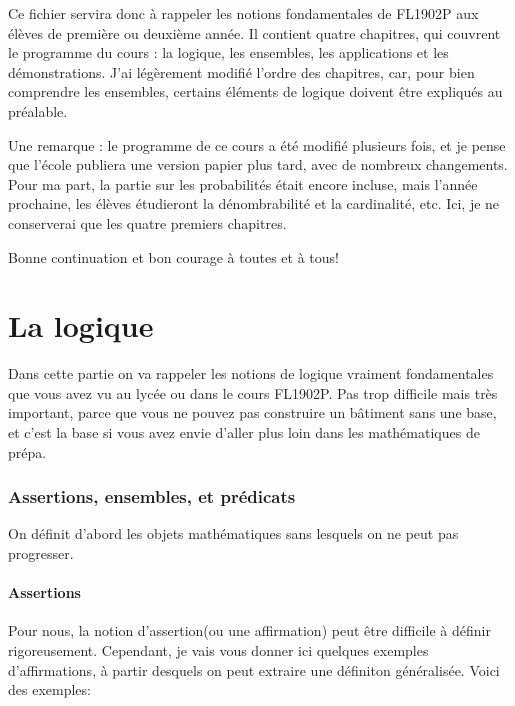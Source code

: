 \documentclass{article}
\begin{document}
Ce fichier servira donc à rappeler les notions fondamentales de FL1902P aux élèves de première ou deuxième année. Il contient quatre chapitres, qui couvrent le programme du cours : la logique, les ensembles, les applications et les démonstrations. J’ai légèrement modifié l’ordre des chapitres, car, pour bien comprendre les ensembles, certains éléments de logique doivent être expliqués au préalable.

Une remarque : le programme de ce cours a été modifié plusieurs fois, et je pense que l’école publiera une version papier plus tard, avec de nombreux changements. Pour ma part, la partie sur les probabilités était encore incluse, mais l’année prochaine, les élèves étudieront la dénombrabilité et la cardinalité, etc. Ici, je ne conserverai que les quatre premiers chapitres.

Bonne continuation et bon courage à toutes et à tous!


\newpage
\tableofcontents

\newpage



\part{La logique}

Dans cette partie on va rappeler les notions de logique vraiment fondamentales que vous avez vu au lycée ou dans le cours FL1902P. Pas trop difficile mais très important, parce que vous ne pouvez pas construire un bâtiment sans une base, et c'est la base si vous avez envie d'aller plus loin dans les mathématiques de prépa.



\section{Assertions, ensembles, et prédicats}

On définit d'abord les objets mathématiques sans lesquels on ne peut pas progresser. 

\subsection{Assertions}

Pour nous, la notion d'assertion(ou une affirmation) peut être difficile à définir rigoreusement. Cependant, je vais vous donner ici quelques exemples d'affirmations, à partir desquels on peut extraire une définiton généralisée. Voici des exemples:
\end{document}
